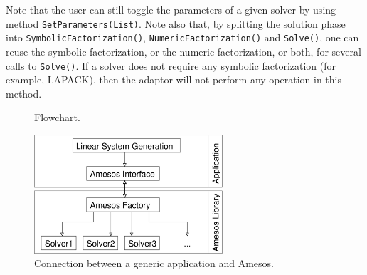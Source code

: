 \documentclass[acmtocl]{acmtrans2m}
\begin{document}
Note that the user can still toggle the parameters of a given solver by using
method \verb!SetParameters(List)!. Note also that, by splitting the solution phase
into \verb!SymbolicFactorization()!, \verb!NumericFactorization()! and
\verb!Solve()!, one can reuse the symbolic factorization, or the numeric
factorization, or both, for several calls to \verb!Solve()!. If a solver does
not require any symbolic factorization (for example, LAPACK), then the adaptor
will not perform any operation in this method.

\begin{figure}
\begin{center}
\end{center}
\caption{Flowchart.}
\label{fig:flowchart}
\end{figure}

\begin{figure}
\begin{center}
\includegraphics[width=7cm]{amesos_and_application.eps}
\end{center}
\caption{Connection between a generic application and Amesos.}
\label{fig:app}
\end{figure}
\end{document}
